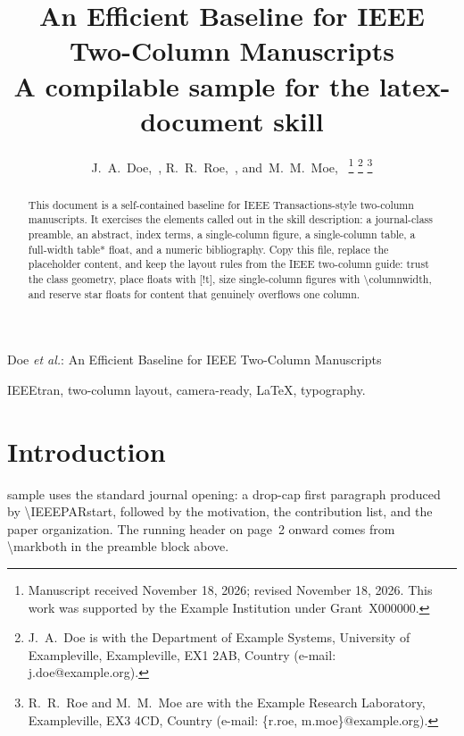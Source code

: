 \documentclass[journal,10pt]{IEEEtran}
\begin{document}
\title{An Efficient Baseline for IEEE Two-Column Manuscripts\\
{\footnotesize A compilable sample for the latex-document skill}}

\author{J.~A.~Doe,~,%
        R.~R.~Roe,~,%
        and~M.~M.~Moe,~%
\thanks{Manuscript received November 18, 2026; revised November 18, 2026.
This work was supported by the Example Institution under Grant~X000000.}%
\thanks{J.~A.~Doe is with the Department of Example Systems, University of
Exampleville, Exampleville, EX1 2AB, Country (e-mail: j.doe@example.org).}%
\thanks{R.~R.~Roe and M.~M.~Moe are with the Example Research Laboratory,
Exampleville, EX3 4CD, Country (e-mail: \{r.roe, m.moe\}@example.org).}}

%
{Doe \MakeLowercase{\textit{et al.}}: An Efficient Baseline for IEEE Two-Column Manuscripts}

\maketitle

\begin{abstract}
This document is a self-contained baseline for IEEE Transactions-style
two-column manuscripts. It exercises the elements called out in the skill
description: a journal-class preamble, an abstract, index terms, a
single-column figure, a single-column table, a full-width table* float, and
a numeric bibliography. Copy this file, replace the placeholder content,
and keep the layout rules from the IEEE two-column guide: trust the class
geometry, place floats with [!t], size single-column figures with
\textbackslash columnwidth, and reserve star floats for content that
genuinely overflows one column.
\end{abstract}

\begin{IEEEkeywords}
IEEEtran, two-column layout, camera-ready, LaTeX, typography.
\end{IEEEkeywords}

\section{Introduction}
 sample uses the standard journal opening: a drop-cap
first paragraph produced by \textbackslash IEEEPARstart, followed by the
motivation, the contribution list, and the paper organization. The running
header on page~2 onward comes from \textbackslash markboth in the preamble
block above.
\end{document}
